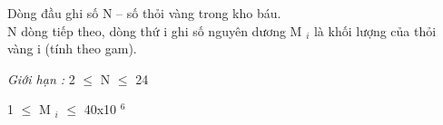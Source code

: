Dòng đầu ghi số N – số thỏi vàng trong kho báu.
\\N dòng tiếp theo, dòng thứ i ghi số nguyên dương M $_ i $ là khối lượng của thỏi vàng i (tính theo gam).

\emph{Giới hạn : } 2  $\le$  N  $\le$  24

1  $\le$  M $_ i $  $\le$  40x10 $^ 6 $

\